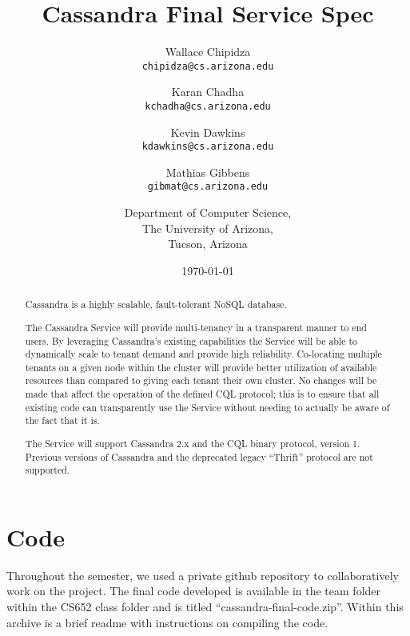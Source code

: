\documentclass[11pt,notitlepage]{report}
\begin{document}
\setcounter{tocdepth}{4}

\title{Cassandra Final Service Spec}
\author{Wallace Chipidza \\
        \texttt{chipidza@cs.arizona.edu} 
        \and 
        Karan Chadha  \\
        \texttt{kchadha@cs.arizona.edu}
        \and 
        Kevin Dawkins \\
        \texttt{kdawkins@cs.arizona.edu} 
        \and 
        Mathias Gibbens \\
        \texttt{gibmat@cs.arizona.edu} \\ \and
Department of Computer Science, \\
The University of Arizona, \\
Tucson, Arizona}
\date{\today}
\maketitle

\null\vfill
\begin{abstract}
Cassandra is a highly scalable, fault-tolerant NoSQL database.

The Cassandra Service will provide multi-tenancy in a transparent manner to end users. By leveraging Cassandra's existing capabilities the Service will be able to dynamically scale to tenant demand and provide high reliability. Co-locating multiple tenants on a given node within the cluster will provide better utilization of available resources than compared to giving each tenant their own cluster. No changes will be made that affect the operation of the defined CQL protocol; this is to ensure that all existing code can transparently use the Service without needing to actually be aware of the fact that it is.

The Service will support Cassandra 2.x and the CQL binary protocol, version 1. Previous versions of Cassandra and the deprecated legacy ``Thrift'' protocol are not supported.
\end{abstract}

\newpage

\tableofcontents

\newpage

\chapter*{Code}
Throughout the semester, we used a private github repository to collaboratively work on the project. The final code developed is available in the team folder within the CS652 class folder and is titled ``cassandra-final-code.zip''. Within this archive is a brief readme with instructions on compiling the code.
\end{document}

